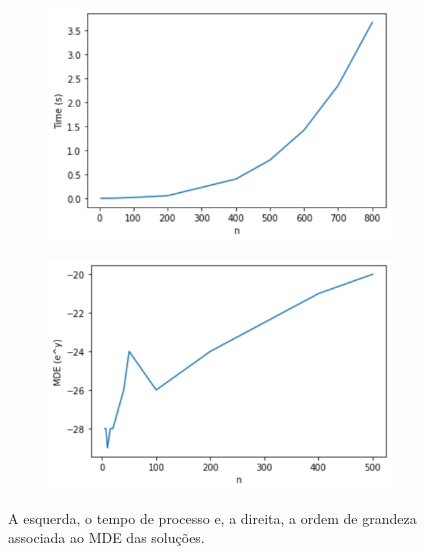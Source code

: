 \documentclass[a4paper,12pt]{report}
\begin{document}
	\begin{figure}[H]
		\begin{center}
			\begin{minipage}{0.45 \linewidth}
				\begin{figure}[H]
					\begin{center}
						\includegraphics[width=1\linewidth]{figures/tempoTriPri.png}
					\end{center}
				\end{figure}
			\end{minipage}
			\hspace{0.1cm}
			\begin{minipage}{0.45 \linewidth}
				
				\begin{figure}[H]
					\begin{center}
						\includegraphics[width=1\linewidth]{figures/mdeTriPro.png}
					\end{center}
					\label{fig:mdeTri}
				\end{figure}
			\end{minipage}
		\end{center}
		\caption{A esquerda, o tempo de processo e, a direita, a ordem de grandeza associada ao MDE das soluções.}
		\label{fig:triPri}
	\end{figure}
	
\end{document}
